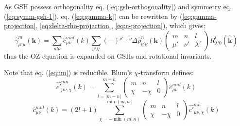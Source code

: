 As \acs{GSH} possess orthogonality eq. (\ref{eq:gsh-orthogonality})
and symmetry eq. (\ref{eq:symm-gsh-1}), eq. (\ref{eq:gamma-k}) can
be rewritten by (\ref{eq:gamma-projection}, \ref{eq:delta-rho-projection},
\ref{eq:c-projection}), which gives:
\begin{equation}
\hat{\gamma}_{\mu'\mu}^{m}(\mathbf{k})=\sum_{nl\nu}\hat{c}_{\mu\nu}^{mnl}(k)\sum_{\nu'\lambda'}\left(-\right){}^{\nu'+\nu}\Delta\hat{\rho}_{\underline{\nu'}\underline{\nu}}^{n}(\mathbf{k})\left(\begin{array}{ccc}
m & n & l\\
\mu' & \nu' & \lambda'
\end{array}\right)R_{\lambda'0}^{l}(\hat{\mathbf{k}})\label{eq:im}
\end{equation}
thus the \acs{OZ} equation is expanded on \acs{GSH}s and rotational
invariants.

Note that eq. (\ref{eq:im}) is reducible. Blum's $\chi$-transform
\citep{Blum_II} defines:  
\begin{equation}
\hat{c'}_{\mu\nu,\chi}^{mn}(k)=\sum_{l=\left|m-n\right|}^{m+n}\left(\begin{array}{ccc}
m & n & l\\
\chi & -\chi & 0
\end{array}\right)\hat{c}_{\mu\nu}^{mnl}(k)
\end{equation}
\begin{equation}
\hat{c}_{\mu\nu}^{mnl}(k)=\left(2l+1\right)\sum_{\chi=-\min(m,n)}^{\min(m,n)}\left(\begin{array}{ccc}
m & n & l\\
\chi & -\chi & 0
\end{array}\right)\hat{c'}_{\mu\nu,\chi}^{mn}(k)\label{eq:c-p}
\end{equation}

